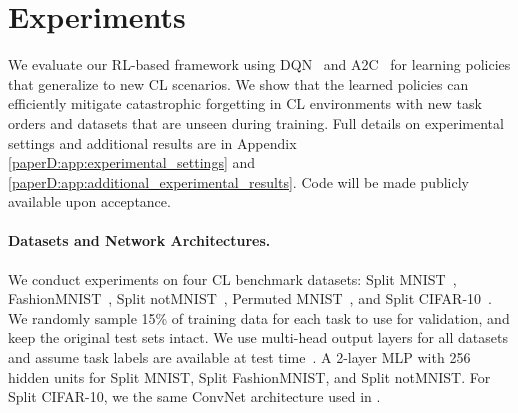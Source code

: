 
\section{Experiments}\label{paperD:sec:experiments}


We evaluate our RL-based framework using DQN~ and A2C~ for learning policies that generalize to new CL scenarios. We show that the learned policies can efficiently mitigate catastrophic forgetting in CL environments with new task orders and datasets that are unseen during training. Full details on experimental settings and additional results are in Appendix \ref{paperD:app:experimental_settings} and \ref{paperD:app:additional_experimental_results}. Code will be made publicly available upon acceptance. 


\vspace{-3mm}
\paragraph{Datasets and Network Architectures.} We conduct experiments on four CL benchmark datasets: Split MNIST~, FashionMNIST~, Split notMNIST~, Permuted MNIST~, and Split CIFAR-10~. We randomly sample 15\% of training data for each task to use for validation, and keep the original test sets intact. 
We use multi-head output layers for all datasets and assume task labels are available at test time~. A 2-layer MLP with 256 hidden units for Split MNIST, Split FashionMNIST, and Split notMNIST. For Split CIFAR-10, we the same ConvNet architecture used in .

\vspace{-3mm}
